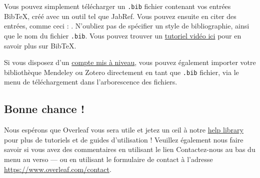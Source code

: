 \documentclass{article}
\begin{document}
Vous pouvez simplement télécharger un \verb|.bib| fichier contenant vos entrées BibTeX, créé avec un outil tel que JabRef. Vous pouvez ensuite en citer des entrées, comme ceci : \cite{greenwade93}. N'oubliez pas de spécifier un style de bibliographie, ainsi que le nom du fichier \verb|.bib|. Vous pouvez trouver un \href{https://www.overleaf.com/help/97-how-to-include-a-bibliography-using-bibtex}{tutoriel vidéo ici} pour en savoir plus sur BibTeX.

Si vous disposez d'un \href{https://www.overleaf.com/user/subscription/plans}{compte mis à niveau}, vous pouvez également importer votre bibliothèque Mendeley ou Zotero directement en tant que \verb|.bib| fichier, via le menu de téléchargement dans l'arborescence des fichiers.

\subsection{Bonne chance !}

Nous espérons que Overleaf vous sera utile et jetez un œil à notre \href{https://www.overleaf.com/learn}{help library} pour plus de tutoriels et de guides d'utilisation ! Veuillez également nous faire savoir si vous avez des commentaires en utilisant le lien Contactez-nous au bas du menu au verso --- ou en utilisant le formulaire de contact à l'adresse \url{https://www.overleaf.com/contact}.



\end{document}
